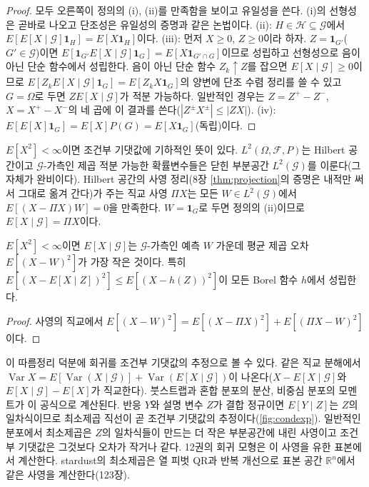 \begin{proof}
모두 오른쪽이 정의의 (i), (ii)를 만족함을 보이고 유일성을 쓴다. (i)의 선형성은 곧바로 나오고 단조성은 유일성의 증명과 같은 논법이다. (ii): $H\in\mathcal H\subseteq\mathcal G$에서 $E[E[X\mid\mathcal G]\mathbf 1_H]=E[X\mathbf 1_H]$이다. (iii): 먼저 $X\ge0$, $Z\ge0$이라 하자. $Z=\mathbf 1_{G'}$($G'\in\mathcal G$)이면 $E[\mathbf 1_{G'}E[X\mid\mathcal G]\mathbf 1_G]=E[X\mathbf 1_{G'\cap G}]$이므로 성립하고 선형성으로 음이 아닌 단순 함수에서 성립한다. 음이 아닌 단순 함수 $Z_k\uparrow Z$를 잡으면 $E[X\mid\mathcal G]\ge0$이므로 $E[Z_kE[X\mid\mathcal G]\mathbf 1_G]=E[Z_kX\mathbf 1_G]$의 양변에 단조 수렴 정리를 쓸 수 있고 $G=\Omega$로 두면 $ZE[X\mid\mathcal G]$가 적분 가능하다. 일반적인 경우는 $Z=Z^+-Z^-$, $X=X^+-X^-$의 네 곱에 이 결과를 쓴다($|Z^\pm X^\pm|\le|ZX|$). (iv): $E[E[X]\mathbf 1_G]=E[X]P(G)=E[X\mathbf 1_G]$(독립)이다.
\end{proof}

$E[X^2]<\infty$이면 조건부 기댓값에 기하적인 뜻이 있다. $L^2(\Omega,\mathcal F,P)$는 Hilbert 공간이고 $\mathcal G$-가측인 제곱 적분 가능한 확률변수들은 닫힌 부분공간 $L^2(\mathcal G)$를 이룬다(그 자체가 완비이다). Hilbert 공간의 사영 정리(8장 \cref{thm:projection}의 증명은 내적만 써서 그대로 옮겨 간다)가 주는 직교 사영 $\Pi X$는 모든 $W\in L^2(\mathcal G)$에서 $E[(X-\Pi X)W]=0$을 만족한다. $W=\mathbf 1_G$로 두면 정의의 (ii)이므로 $E[X\mid\mathcal G]=\Pi X$이다.

\begin{corollary}
\label{cor:best-predictor}
$E[X^2]<\infty$이면 $E[X\mid\mathcal G]$는 $\mathcal G$-가측인 예측 $W$ 가운데 평균 제곱 오차 $E[(X-W)^2]$가 가장 작은 것이다. 특히 $E[(X-E[X\mid Z])^2]\le E[(X-h(Z))^2]$이 모든 Borel 함수 $h$에서 성립한다.
\end{corollary}

\begin{proof}
사영의 직교에서 $E[(X-W)^2]=E[(X-\Pi X)^2]+E[(\Pi X-W)^2]$이다.
\end{proof}

이 따름정리 덕분에 회귀를 조건부 기댓값의 추정으로 볼 수 있다. 같은 직교 분해에서  $\operatorname{Var}X=E[\operatorname{Var}(X\mid\mathcal G)]+\operatorname{Var}(E[X\mid\mathcal G])$이 나온다($X-E[X\mid\mathcal G]$와 $E[X\mid\mathcal G]-E[X]$가 직교한다). 붓스트랩과 혼합 분포의 분산, 비중심 분포의 모멘트가 이 공식으로 계산된다. 반응 $Y$와 설명 변수 $Z$가 결합 정규이면 $E[Y\mid Z]$는 $Z$의 일차식이므로 최소제곱 직선이 곧 조건부 기댓값의 추정이다(\cref{fig:condexp}). 일반적인 분포에서 최소제곱은 $Z$의 일차식들이 만드는 더 작은 부분공간에 내린 사영이고 조건부 기댓값은 그것보다 오차가 작거나 같다. 12권의 회귀 모형은 이 사영을 유한 표본에서 계산한다. stardust의 최소제곱은 열 피벗 QR과 반복 개선으로 표본 공간 $\mathbb R^n$에서 같은 사영을 계산한다(123장).

